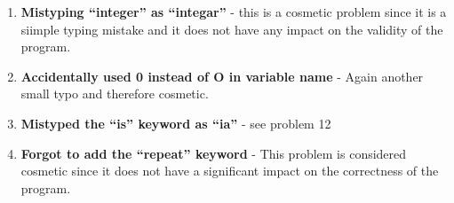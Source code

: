 \begin{enumerate}
\item \textbf{Mistyping “integer” as “integar”}  - this is a cosmetic problem since it is a siimple typing mistake and it does not have any impact on the validity of the program.
\item \textbf{ Accidentally used 0 instead of O in variable name}  - Again another small typo and therefore cosmetic.
\item \textbf{Mistyped the “is” keyword as “ia”}  - see problem 12
\item \textbf{Forgot to add the “repeat” keyword} - This problem is considered cosmetic since it does not have a significant impact on the correctness of the program.

\end{enumerate}

